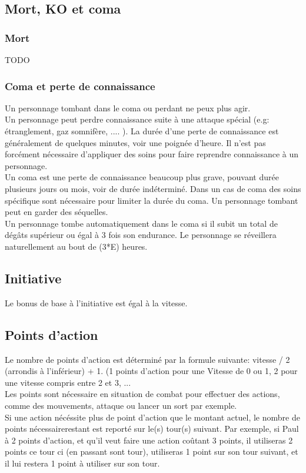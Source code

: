 \subsection{Mort, KO et coma}

\subsubsection*{Mort}
TODO

\subsubsection*{Coma et perte de connaissance}
Un personnage tombant dans le coma ou perdant ne peux plus agir. \\
Un personnage peut perdre connaissance suite à une attaque spécial (e.g: étranglement, gaz somnifère, .... ). La durée d'une perte de connaissance est généralement  de quelques minutes, voir une poignée d'heure. Il n'est pas forcément nécessaire d'appliquer des soins pour faire reprendre connaissance à un personnage. \\
Un coma est une perte de connaissance beaucoup plus grave, pouvant durée plusieurs jours ou mois, voir de durée indéterminé. Dans un cas de coma des soins spécifique sont nécessaire pour limiter la durée du coma. Un personnage tombant peut en garder des séquelles. \\
Un personnage tombe automatiquement dans le coma si il subit un total de dégâts supérieur ou égal à 3 fois son endurance. Le personnage se réveillera naturellement au bout de (3*E) heures. 

\subsection{Initiative}
Le bonus de base à l'initiative est égal à la vitesse.

\subsection{Points d'action}
Le nombre de points d'action est déterminé par la formule suivante: vitesse / 2 (arrondis à l'inférieur) + 1. (1 points d'action pour une Vitesse de 0 ou 1, 2 pour une vitesse compris entre 2 et  3, ... \\
Les points sont nécessaire en situation de combat pour effectuer des actions, comme des mouvements, attaque ou lancer un sort par exemple. \\
Si une action nécéssite plus de point d'action que le montant actuel, le nombre de points nécessairerestant est reporté sur le(s) tour(s) suivant. Par exemple, si Paul à 2 points d'action, et qu'il veut faire une action coûtant 3 points, il utiliseras 2 points ce tour ci (en passant sont tour), utiliseras 1 point sur son tour suivant, et il lui restera 1 point à utiliser sur son tour.

